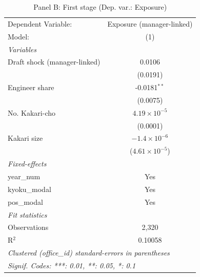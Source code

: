 \documentclass[11pt]{article}
\begin{document}
\vspace{1em}
\begin{table}[htbp]
   \caption{\label{tab:panel_b} Panel B: First stage (Dep. var.: Exposure)}
   \centering
   \begin{tabular}{lc}
      \tabularnewline \midrule \midrule
      Dependent Variable:          & Exposure (manager-linked)\\  
      Model:                       & (1)\\  
      \midrule
      \emph{Variables}\\
      Draft shock (manager-linked) & 0.0106\\   
                                   & (0.0191)\\   
      Engineer share               & -0.0181$^{**}$\\   
                                   & (0.0075)\\   
      No. Kakari-cho               & $4.19\times 10^{-5}$\\    
                                   & (0.0001)\\   
      Kakari size                  & $-1.4\times 10^{-6}$\\    
                                   & ($4.61\times 10^{-5}$)\\    
      \midrule
      \emph{Fixed-effects}\\
      year\_num                    & Yes\\  
      kyoku\_modal                 & Yes\\  
      pos\_modal                   & Yes\\  
      \midrule
      \emph{Fit statistics}\\
      Observations                 & 2,320\\  
      R$^2$                        & 0.10058\\  
      \midrule \midrule
      \multicolumn{2}{l}{\emph{Clustered (office\_id) standard-errors in parentheses}}\\
      \multicolumn{2}{l}{\emph{Signif. Codes: ***: 0.01, **: 0.05, *: 0.1}}\\
   \end{tabular}
\end{table}
\end{document}
